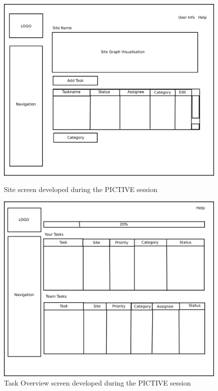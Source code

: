 \documentclass[12pt,a4paper]{report}
\begin{document}
\begin{figure}[!h]
\begin{minipage}[b]{0.48\textwidth}
    \begin{center}
        \includegraphics[scale=0.25]{figures/site.pdf}
    \end{center}
    \caption{Site screen developed during the PICTIVE session}
    \label{pictive_site}
\end{minipage}
\hspace{0.5cm}
\begin{minipage}[b]{0.48\textwidth}
    \begin{center}
        \includegraphics[scale=0.23]{figures/task_list.pdf}
    \end{center}
    \caption{Task Overview screen developed during the PICTIVE session}
    \label{pictive_tasks}
\end{minipage}
\end{figure}
\end{document}
